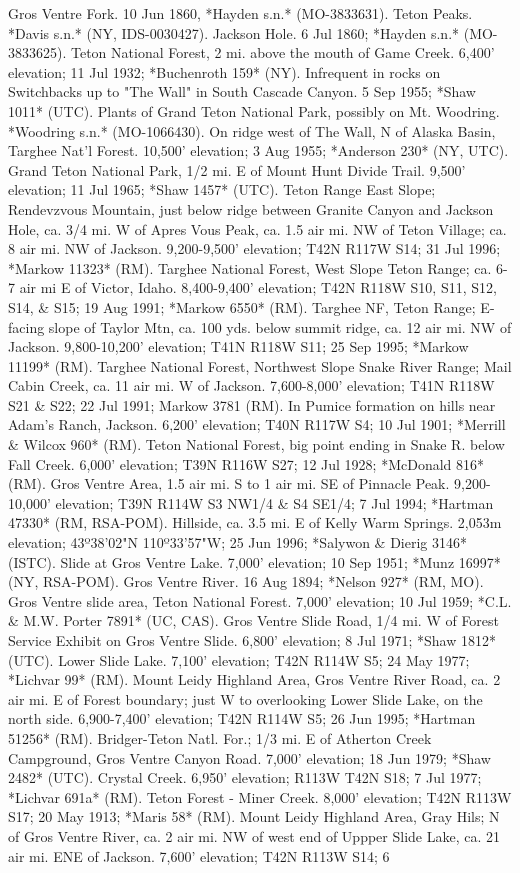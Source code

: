 Gros Ventre Fork. 10 Jun 1860, *Hayden s.n.* (MO-3833631).  Teton Peaks. *Davis s.n.* (NY, IDS-0030427).  Jackson Hole. 6 Jul 1860; *Hayden s.n.* (MO-3833625).  Teton National Forest, 2 mi. above the mouth of Game Creek. 6,400' elevation; 11 Jul 1932; *Buchenroth 159* (NY).  Infrequent in rocks on Switchbacks up to "The Wall" in South Cascade Canyon. 5 Sep 1955; *Shaw 1011* (UTC).  Plants of Grand Teton National Park, possibly on Mt. Woodring. *Woodring s.n.* (MO-1066430).  On ridge west of The Wall, N of Alaska Basin, Targhee Nat'l Forest. 10,500' elevation; 3 Aug 1955; *Anderson 230* (NY, UTC).  Grand Teton National Park, 1/2 mi. E of Mount Hunt Divide Trail. 9,500' elevation; 11 Jul 1965; *Shaw 1457* (UTC).  Teton Range East Slope; Rendevzvous Mountain, just below ridge between Granite Canyon and Jackson Hole, ca. 3/4 mi. W of Apres Vous Peak, ca. 1.5 air mi. NW of Teton Village; ca. 8 air mi. NW of Jackson. 9,200-9,500' elevation; T42N R117W S14; 31 Jul 1996; *Markow 11323* (RM).  Targhee National Forest, West Slope Teton Range; ca. 6-7 air mi E of Victor, Idaho.  8,400-9,400' elevation; T42N R118W S10, S11, S12, S14, \& S15; 19 Aug 1991; *Markow 6550* (RM).  Targhee NF, Teton Range; E-facing slope of Taylor Mtn, ca. 100 yds. below summit ridge, ca. 12 air mi. NW of Jackson.  9,800-10,200' elevation; T41N R118W S11; 25 Sep 1995; *Markow 11199* (RM).  Targhee National Forest, Northwest Slope Snake River Range; Mail Cabin Creek, ca. 11 air mi. W of Jackson.  7,600-8,000’ elevation; T41N R118W S21 & S22; 22 Jul 1991; Markow 3781 (RM).  In Pumice formation on hills near Adam's Ranch, Jackson. 6,200' elevation; T40N R117W S4; 10 Jul 1901; *Merrill \& Wilcox 960* (RM).  Teton National Forest, big point ending in Snake R. below Fall Creek. 6,000' elevation; T39N R116W S27; 12 Jul 1928; *McDonald 816* (RM).  Gros Ventre Area, 1.5 air mi. S to 1 air mi. SE of Pinnacle Peak.  9,200-10,000' elevation; T39N R114W S3 NW1/4 \& S4 SE1/4; 7 Jul 1994; *Hartman 47330* (RM, RSA-POM).  Hillside, ca. 3.5 mi. E of Kelly Warm Springs. 2,053m elevation; 43º38'02"N 110º33'57"W; 25 Jun 1996; *Salywon & Dierig 3146* (ISTC).  Slide at Gros Ventre Lake. 7,000' elevation; 10 Sep 1951; *Munz 16997* (NY, RSA-POM).  Gros Ventre River. 16 Aug 1894; *Nelson 927* (RM, MO).  Gros Ventre slide area, Teton National Forest. 7,000' elevation; 10 Jul 1959; *C.L. \& M.W. Porter 7891* (UC, CAS).  Gros Ventre Slide Road, 1/4 mi. W of Forest Service Exhibit on Gros Ventre Slide. 6,800' elevation; 8 Jul 1971; *Shaw 1812* (UTC).  Lower Slide Lake. 7,100' elevation; T42N R114W S5; 24 May 1977; *Lichvar 99* (RM).  Mount Leidy Highland Area, Gros Ventre River Road, ca. 2 air mi. E of Forest boundary; just W to overlooking Lower Slide Lake, on the north side.  6,900-7,400' elevation; T42N R114W S5; 26 Jun 1995; *Hartman 51256* (RM).  Bridger-Teton Natl. For.; 1/3 mi. E of Atherton Creek Campground, Gros Ventre Canyon Road. 7,000' elevation; 18 Jun 1979; *Shaw 2482* (UTC).  Crystal Creek. 6,950' elevation; R113W T42N S18; 7 Jul 1977; *Lichvar 691a* (RM).  Teton Forest - Miner Creek. 8,000' elevation; T42N R113W S17; 20 May 1913; *Maris 58* (RM).  Mount Leidy Highland Area, Gray Hils; N of Gros Ventre River, ca. 2 air mi. NW of west end of Uppper Slide Lake, ca. 21 air mi. ENE of Jackson. 7,600' elevation; T42N R113W S14; 6 